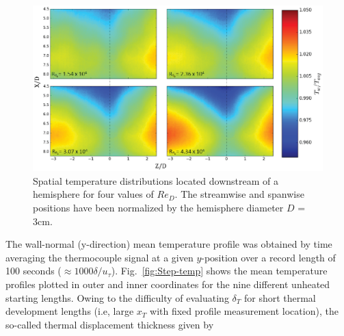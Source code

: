 
\begin{figure}[h!]
\centering
\includegraphics[scale=.75]{figures/facility/hemi_IR.eps}
\caption{Spatial temperature distributions located downstream of a hemisphere for four values of $Re_D$. The streamwise and spanwise positions have been normalized by the hemisphere diameter $D$ = 3cm.} 
\label{fig:IR-HEMI}
\end{figure}

The wall-normal (y-direction) mean temperature profile was obtained by time averaging the thermocouple signal at a given $y$-position over a record length of 100 seconds ($\approx1000 \delta/u_\tau$). Fig.~\ref{fig:Step-temp} shows the mean temperature profiles plotted in outer and inner coordinates for the nine different unheated starting lengths. Owing to the difficulty of evaluating $\delta_T$ for short thermal development lengths (i.e, large $x_T$ with fixed profile measurement location), the so-called thermal displacement thickness given by 

